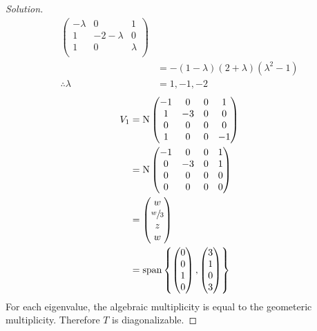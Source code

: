 \documentclass[fleqn, a4paper, 12pt]{article}
\newcommand{\N}{\mathrm{N}}
\theoremstyle{definition}
\theoremstyle{theorem}
\newenvironment{solution}
{\begin{proof}[Solution]\let\qed\relax}
	{\end{proof}}
\DeclareMathOperator{\vspan}{\mathrm{span}} %
\begin{document}
\begin{solution}
\begin{align*}
			\begin{pmatrix}
				-\lambda & 0 & 1\\
				1 & -2 -\lambda & 0\\
				1 & 0 & \lambda\\
			\end{pmatrix}\\
		&= - (1 - \lambda) (2 + \lambda) (\lambda^2 - 1)\\
		\therefore \lambda &= 1, -1, -2
	\end{align*}
	\begin{align*}
		V_1 &= \N 
			\begin{pmatrix}
				-1 & 0 & 0 & 1\\
				1 & -3 & 0 & 0\\
				0 & 0 & 0 & 0\\
				1 & 0 & 0 & -1\\
			\end{pmatrix}\\
		&= \N
			\begin{pmatrix}
				-1 & 0 & 0 & 1\\
				0 & -3 & 0 & 1\\
				0 & 0 & 0 & 0\\
				0 & 0 & 0 & 0\\
			\end{pmatrix}\\
		&= 
			\begin{pmatrix}
				w\\
				\sfrac{w}{3}\\
				z\\
				w\\
			\end{pmatrix}\\
		&= \vspan
			\left\lbrace
				\begin{pmatrix}
					0\\
					0\\
					1\\
					0\\
				\end{pmatrix}
				,
				\begin{pmatrix}
					3\\
					1\\
					0\\
					3\\
				\end{pmatrix}
			\right\rbrace
	\end{align*}
	For each eigenvalue, the algebraic multiplicity is equal to the geometeric multiplicity. Therefore $T$ is diagonalizable.
\end{solution}
\end{document}
